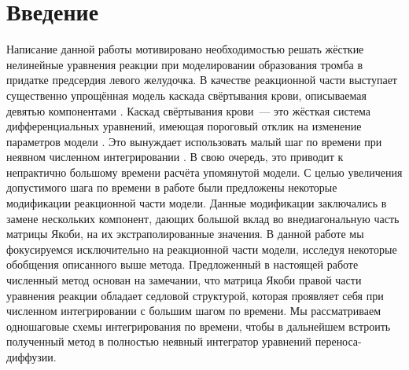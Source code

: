 \chapter{Введение}
\label{chapter:introduction} 

Написание данной работы мотивировано необходимостью решать жёсткие нелинейные уравнения
реакции при моделировании образования тромба в придатке предсердия левого желудочка.
В качестве реакционной части выступает существенно упрощённая модель каскада свёртывания крови, описываемая девятью компонентами \cite{bouchnita2020mathematical}.
Каскад свёртывания крови~--- это жёсткая система дифференциальных уравнений, имеющая пороговый отклик на изменение параметров модели \cite{shen2008threshold}.
Это вынуждает использовать малый шаг по времени при неявном численном интегрировании \cite{douglas1967generalizedrk}.
В свою очередь, это приводит к непрактично большому времени расчёта упомянутой модели.
С целью увеличения допустимого шага по времени в работе \cite{vassilevski2020parallel} были предложены некоторые модификации реакционной части модели.
Данные модификации заключались в замене нескольких компонент, дающих большой вклад во внедиагональную часть матрицы Якоби, на их экстраполированные значения.
В данной работе мы фокусируемся исключительно на реакционной части модели, исследуя некоторые обобщения описанного выше метода.
Предложенный в настоящей работе численный метод основан на замечании, что матрица Якоби правой части уравнения реакции обладает седловой структурой,
которая проявляет себя при численном интегрировании с большим шагом по времени.
Мы рассматриваем одношаговые схемы интегрирования по времени, чтобы в дальнейшем встроить полученный метод в полностью неявный интегратор уравнений переноса-диффузии.

